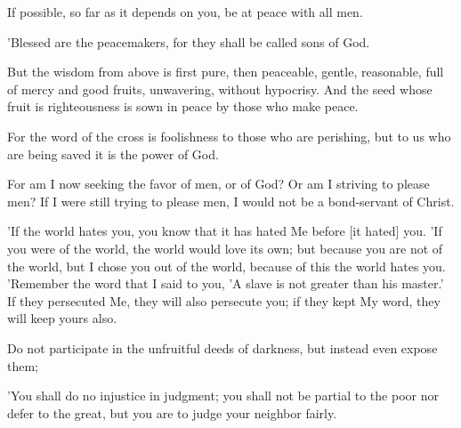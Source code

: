 \begin{scripture}[Romans 12:18]
    If possible, so far as it depends on you, be at peace with all men.
\end{scripture}

\begin{scripture}[Matthew 5:9]
    'Blessed are the peacemakers, for they shall be called sons of God.
\end{scripture}

\begin{scripture}[James 3:17-18]
    But the wisdom from above is first pure, then peaceable, gentle, reasonable, full of mercy and good fruits, unwavering, without hypocrisy.
    And the seed whose fruit is righteousness is sown in peace by those who make peace.
\end{scripture}

\begin{scripture}[1 Corinthians 1:18]
    For the word of the cross is foolishness to those who are perishing, but to us who are being saved it is the power of God.
\end{scripture}

\begin{scripture}[Galatians 1:10]
    For am I now seeking the favor of men, or of God? Or am I striving to please men? If I were still trying to please men, I would not be a bond-servant of Christ.
\end{scripture}

\begin{scripture}[John 15:18-20]
    'If the world hates you, you know that it has hated Me before [it hated] you.
    'If you were of the world, the world would love its own; but because you are not of the world, but I chose you out of the world, because of this the world hates you.
    'Remember the word that I said to you, 'A slave is not greater than his master.' If they persecuted Me, they will also persecute you; if they kept My word, they will keep yours also.
\end{scripture}

\begin{scripture}[Ephesians 5:11]
    Do not participate in the unfruitful deeds of darkness, but instead even expose them;
\end{scripture}

\begin{scripture}[Leviticus 19:15]
    'You shall do no injustice in judgment; you shall not be partial to the poor nor defer to the great, but you are to judge your neighbor fairly.
\end{scripture}

